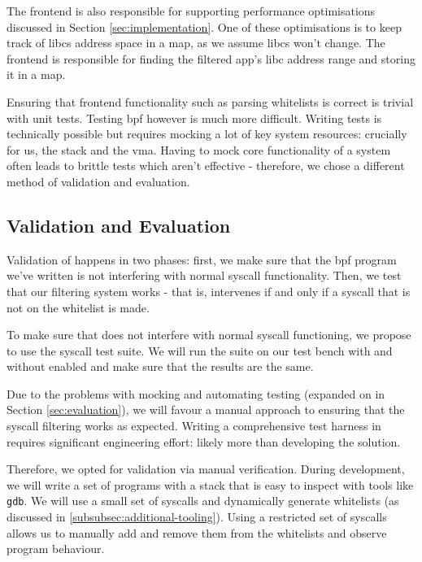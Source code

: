 The frontend is also responsible for supporting performance optimisations
discussed in Section \ref{sec:implementation}. One of these optimisations is
to keep track of \acp{libc} address space in a map, as we assume \acp{libc} won't
change. The frontend is responsible for finding the filtered app's \ac{libc}
address range and storing it in a map.

Ensuring that frontend functionality such as parsing whitelists is correct is
trivial with unit tests. Testing \ac{bpf} however is much more difficult.
Writing tests is technically possible but requires mocking a lot of key system
resources: crucially for us, the stack and the \ac{vma}. Having to mock core
functionality of a system often leads to brittle tests which aren't effective -
therefore, we chose a different method of validation and evaluation.

\subsection{Validation and Evaluation}


Validation of \af happens in two phases: first, we make sure that the \ac{bpf}
program we've written is not interfering with normal syscall functionality. Then,
we test that our filtering system works - that is, \af intervenes if and only if
a syscall that is not on the whitelist is made.

To make sure that \af does not interfere with normal syscall functioning, we
propose to use the  syscall test suite. We will run the suite on our
test bench with and without \af enabled and make sure that the results are the
same.

Due to the problems with mocking and automating testing (expanded on in Section
\ref{sec:evaluation}), we will favour a manual approach to ensuring that the 
syscall filtering works as expected. Writing a comprehensive test harness in requires 
significant engineering effort: likely more than developing the solution. 

Therefore, we opted for validation via manual
verification. During development, we will write a set of programs with a stack 
that is easy to inspect with tools like \texttt{gdb}. We will use a small set of
syscalls and dynamically generate whitelists (as discussed in
\ref{subsubsec:additional-tooling}). Using a restricted set of syscalls allows
us to manually add and remove them from the whitelists and observe program
behaviour.

